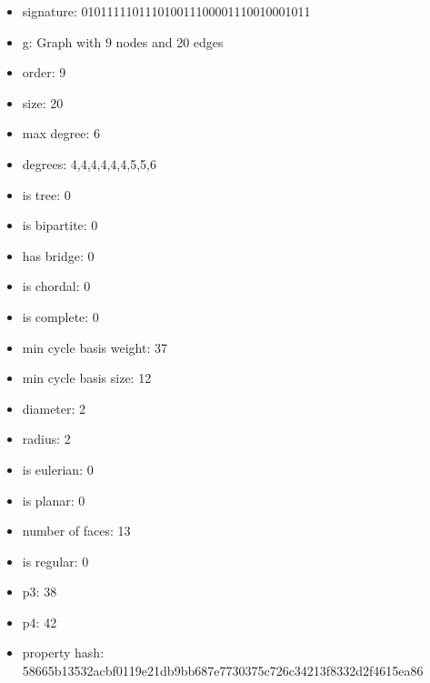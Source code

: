 \newpage
\begin{figure}
\end{figure}
\begin{itemize}
\item signature: 010111110111010011100001110010001011
\item g: Graph with 9 nodes and 20 edges
\item order: 9
\item size: 20
\item max degree: 6
\item degrees: 4,4,4,4,4,4,5,5,6
\item is tree: 0
\item is bipartite: 0
\item has bridge: 0
\item is chordal: 0
\item is complete: 0
\item min cycle basis weight: 37
\item min cycle basis size: 12
\item diameter: 2
\item radius: 2
\item is eulerian: 0
\item is planar: 0
\item number of faces: 13
\item is regular: 0
\item p3: 38
\item p4: 42
\item property hash: 58665b13532acbf0119e21db9bb687e7730375c726c34213f8332d2f4615ea86
\end{itemize}
